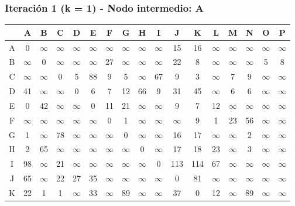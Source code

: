 \documentclass[12pt]{article}
\begin{document}
\subsubsection{Iteración 1 (k = 1) - Nodo intermedio: A}
\begin{table}[h!]
\centering
\begin{tabular}{|c|c|c|c|c|c|c|c|c|c|c|c|c|c|c|c|c|}
\hline
 & A & B & C & D & E & F & G & H & I & J & K & L & M & N & O & P \\\hline
A & 0 & $\infty$ & $\infty$ & $\infty$ & $\infty$ & $\infty$ & $\infty$ & $\infty$ & $\infty$ & 15 & 16 & $\infty$ & $\infty$ & $\infty$ & $\infty$ & $\infty$ \\\hline
B & $\infty$ & 0 & $\infty$ & $\infty$ & $\infty$ & 27 & $\infty$ & $\infty$ & $\infty$ & 22 & 8 & $\infty$ & $\infty$ & $\infty$ & 5 & 8 \\\hline
C & $\infty$ & $\infty$ & 0 & 5 & 88 & 9 & 5 & $\infty$ & 67 & 9 & 3 & $\infty$ & 7 & 9 & $\infty$ & $\infty$ \\\hline
D & 41 & $\infty$ & $\infty$ & 0 & 6 & 7 & 12 & 66 & 9 & 31 & 45 & $\infty$ & 6 & 6 & $\infty$ & $\infty$ \\\hline
E & 0 & 42 & $\infty$ & $\infty$ & 0 & 11 & 21 & $\infty$ & $\infty$ & 9 & 7 & 12 & $\infty$ & $\infty$ & $\infty$ & $\infty$ \\\hline
F & $\infty$ & $\infty$ & $\infty$ & $\infty$ & $\infty$ & 0 & 1 & $\infty$ & $\infty$ & $\infty$ & 9 & 1 & 23 & 56 & $\infty$ & $\infty$ \\\hline
G & 1 & $\infty$ & 78 & $\infty$ & $\infty$ & $\infty$ & 0 & $\infty$ & $\infty$ & \cellcolor{lightgreen} 16 & 17 & $\infty$ & $\infty$ & 2 & $\infty$ & $\infty$ \\\hline
H & 2 & 65 & $\infty$ & $\infty$ & $\infty$ & $\infty$ & $\infty$ & 0 & $\infty$ & \cellcolor{lightgreen} 17 & \cellcolor{lightgreen} 18 & 23 & $\infty$ & 3 & $\infty$ & $\infty$ \\\hline
I & 98 & $\infty$ & 21 & $\infty$ & $\infty$ & $\infty$ & $\infty$ & $\infty$ & 0 & \cellcolor{lightgreen} 113 & \cellcolor{lightgreen} 114 & 67 & $\infty$ & $\infty$ & $\infty$ & $\infty$ \\\hline
J & 65 & $\infty$ & 22 & 27 & 35 & $\infty$ & $\infty$ & $\infty$ & $\infty$ & 0 & \cellcolor{lightgreen} 81 & $\infty$ & $\infty$ & $\infty$ & $\infty$ & $\infty$ \\\hline
K & 22 & 1 & 1 & $\infty$ & 33 & $\infty$ & 89 & $\infty$ & $\infty$ & \cellcolor{lightgreen} 37 & 0 & 12 & $\infty$ & 89 & $\infty$ & $\infty$ \\\hline

\end{tabular}
\end{table}
\end{document}
